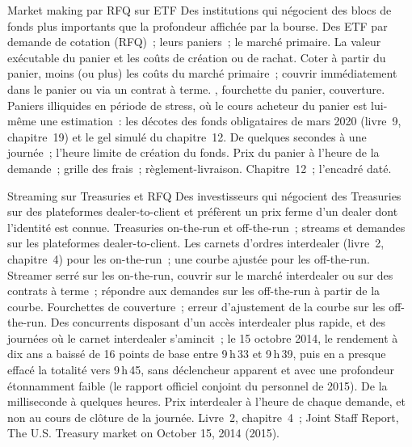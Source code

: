 \begin{strategyfile}{Market making par RFQ sur ETF}\label{strat:hf:bond-and-etf-request-for-quote-market-making:etf}
 Des institutions qui négocient des blocs de fonds plus importants que la profondeur affichée par la bourse.
 Des ETF par demande de cotation (RFQ)~; leurs paniers~; le marché primaire.
 La valeur exécutable du panier et les coûts de création ou de rachat.
 Coter à partir du panier, moins (ou plus) les coûts du marché primaire~; couvrir immédiatement dans le panier ou via un contrat à terme.
 , fourchette du panier, couverture.
 Paniers illiquides en période de stress, où le cours acheteur du panier est lui-même une estimation~: les décotes des fonds obligataires de mars 2020 (livre~9,
chapitre~19) et le gel simulé du chapitre~12.
 De quelques secondes à une journée~; l'heure limite de création du fonds.
 Prix du panier à l'heure de la demande~; grille des frais~; règlement-livraison.
 Chapitre~12~; l'encadré daté.
\end{strategyfile}

\begin{strategyfile}{Streaming sur Treasuries et RFQ}\label{strat:hf:bond-and-etf-request-for-quote-market-making:ust}
 Des investisseurs qui négocient des Treasuries sur des plateformes dealer-to-client et préfèrent un prix ferme d'un dealer dont l'identité est connue.
 Treasuries on-the-run et off-the-run~; streams et demandes sur les plateformes dealer-to-client.
 Les carnets d'ordres interdealer (livre~2, chapitre~4) pour les on-the-run~; une courbe ajustée pour les off-the-run.
 Streamer serré sur les on-the-run, couvrir sur le marché interdealer ou sur des contrats à terme~; répondre aux demandes sur les off-the-run à partir de la courbe.
 Fourchettes de couverture~; erreur d'ajustement de la courbe sur les off-the-run.
 Des concurrents disposant d'un accès interdealer plus rapide, et des journées où le carnet interdealer s'amincit~; le 15 octobre 2014, le rendement à dix ans
a baissé de 16 points de base entre 9\,h\,33 et 9\,h\,39, puis en a presque effacé la totalité vers 9\,h\,45, sans déclencheur apparent et avec une profondeur étonnamment faible
(le rapport officiel conjoint du personnel de 2015).
 De la milliseconde à quelques heures.
 Prix interdealer à l'heure de chaque demande, et non au cours de clôture de la journée.
 Livre~2, chapitre~4~; Joint Staff Report, The U.S. Treasury market on October 15, 2014 (2015).
\end{strategyfile}

